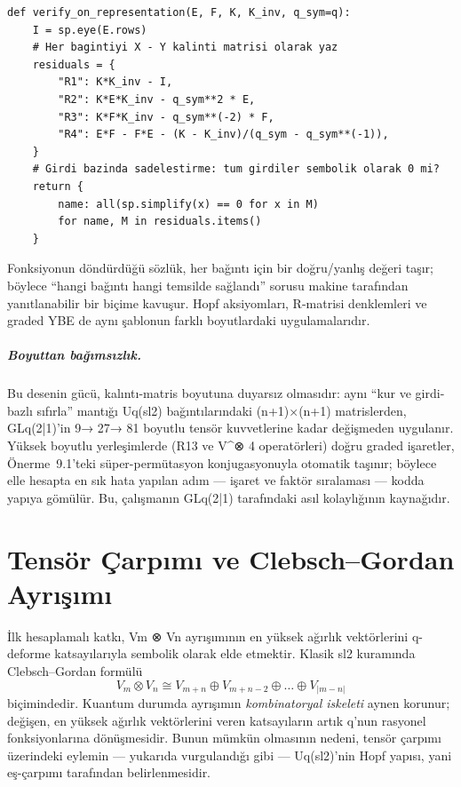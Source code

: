 \documentclass[12pt,a4paper]{report}
\numberwithin{equation}{chapter}
\theoremstyle{plain}
\theoremstyle{definition}
\begin{document}
\begin{lstlisting}[style=pyblock,caption={Tanimlayici bagintilarin sifir-kalinti yontemiyle dogrulanmasi}]
def verify_on_representation(E, F, K, K_inv, q_sym=q):
    I = sp.eye(E.rows)
    # Her bagintiyi X - Y kalinti matrisi olarak yaz
    residuals = {
        "R1": K*K_inv - I,
        "R2": K*E*K_inv - q_sym**2 * E,
        "R3": K*F*K_inv - q_sym**(-2) * F,
        "R4": E*F - F*E - (K - K_inv)/(q_sym - q_sym**(-1)),
    }
    # Girdi bazinda sadelestirme: tum girdiler sembolik olarak 0 mi?
    return {
        name: all(sp.simplify(x) == 0 for x in M)
        for name, M in residuals.items()
    }
\end{lstlisting}

Fonksiyonun döndürdüğü sözlük, her bağıntı için bir doğru/yanlış değeri taşır;
böylece ``hangi bağıntı hangi temsilde sağlandı'' sorusu makine tarafından
yanıtlanabilir bir biçime kavuşur. Hopf aksiyomları, R-matrisi denklemleri ve
graded YBE de aynı şablonun farklı boyutlardaki uygulamalarıdır.

\paragraph{Boyuttan bağımsızlık.} Bu desenin gücü, kalıntı-matris boyutuna
duyarsız olmasıdır: aynı ``kur ve girdi-bazlı sıfırla'' mantığı Uq(sl2)
bağıntılarındaki (n+1)×(n+1) matrislerden, GLq(2|1)'in
9→ 27→ 81 boyutlu tensör kuvvetlerine kadar değişmeden uygulanır. Yüksek
boyutlu yerleşimlerde (R13 ve V^⊗ 4 operatörleri) doğru graded
işaretler, Önerme~9.1'teki süper-permütasyon konjugasyonuyla
otomatik taşınır; böylece elle hesapta en sık hata yapılan adım --- işaret ve
faktör sıralaması --- kodda yapıya gömülür. Bu, çalışmanın GLq(2|1)
tarafındaki asıl kolaylığının kaynağıdır.

\chapter{Tensör Çarpımı ve Clebsch--Gordan Ayrışımı}

İlk hesaplamalı katkı, Vm ⊗ Vn ayrışımının en yüksek ağırlık
vektörlerini q-deforme katsayılarıyla sembolik olarak elde etmektir. Klasik
sl2 kuramında Clebsch--Gordan formülü
\[
  V_m \otimes V_n \cong V_{m+n} \oplus V_{m+n-2} \oplus \dots \oplus V_{|m-n|}
\]
biçimindedir. Kuantum durumda ayrışımın \emph{kombinatoryal iskeleti} aynen
korunur; değişen, en yüksek ağırlık vektörlerini veren katsayıların artık
q'nun rasyonel fonksiyonlarına dönüşmesidir. Bunun mümkün olmasının nedeni,
tensör çarpımı üzerindeki eylemin --- yukarıda vurgulandığı gibi --- Uq(sl2)'nin
Hopf yapısı, yani eş-çarpımı tarafından belirlenmesidir.
\end{document}
